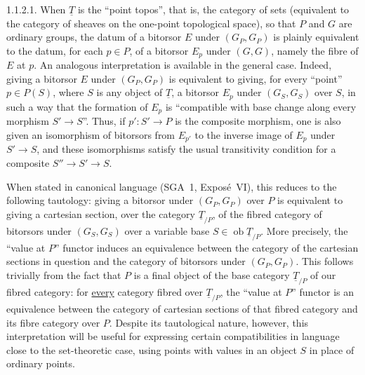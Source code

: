 1.1.2.1. When $\underline T$ is the ``point topos'', that is, the
category of sets (equivalent to the category of sheaves on the one-point
topological space), so that $P$ and $G$ are ordinary groups, the datum of
a bitorsor $E$ under $(G_P,G_P)$ is plainly equivalent to the datum, for
each $p\in P$, of a bitorsor $E_p$ under $(G,G)$, namely the fibre of $E$
at $p$. An analogous interpretation is available in the general case.
Indeed, giving a bitorsor $E$ under $(G_P,G_P)$ is equivalent to giving,
for every ``point'' $p\in P(S)$, where $S$ is any object of
$\underline T$, a bitorsor $E_p$ under $(G_S,G_S)$ over $S$, in such a
way that the formation of $E_p$ is ``compatible with base change along
every morphism $S'\longrightarrow S$''. Thus, if
$p':S'\longrightarrow P$ is the composite morphism, one is also given an
isomorphism of bitorsors from $E_{p'}$ to the inverse image of $E_p$ under
$S'\longrightarrow S$, and these isomorphisms satisfy the usual
transitivity condition for a composite
$S''\longrightarrow S'\longrightarrow S$.


When stated in canonical language (SGA~1, Expos\'e~VI), this reduces to
the following tautology: giving a bitorsor under $(G_P,G_P)$ over $P$ is
equivalent to giving a cartesian section, over the category
$\underline T_{/P}$, of the fibred category of bitorsors under
$(G_S,G_S)$ over a variable base $S\in\operatorname{ob}\underline
T_{/P}$. More precisely, the ``value at $P$'' functor induces an
equivalence between the category of the cartesian sections in question
and the category of bitorsors under $(G_P,G_P)$. This follows trivially
from the fact that $P$ is a final object of the base category
$\underline T_{/P}$ of our fibred category: for \underline{every}
category fibred over $\underline T_{/P}$, the ``value at $P$'' functor is
an equivalence between the category of cartesian sections of that fibred
category and its fibre category over $P$. Despite its tautological
nature, however, this interpretation will be useful for expressing
certain compatibilities in language close to the set-theoretic case,
using points with values in an object $S$ in place of ordinary points.

